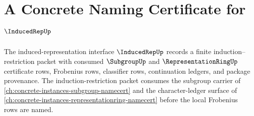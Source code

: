 \chapter{A Concrete Naming Certificate for $\InducedRepUp$}
\label{ch:concrete-instances-inducedrep-namecert}

The induced-representation interface $\InducedRepUp$ records a finite induction--restriction packet with consumed $\SubgroupUp$ and $\RepresentationRingUp$ certificate rows, Frobenius rows, classifier rows, continuation ledgers, and package provenance. The induction-restriction packet consumes the subgroup carrier of \autoref{ch:concrete-instances-subgroup-namecert} and the character-ledger surface of \autoref{ch:concrete-instances-representationring-namecert} before the local Frobenius rows are named.





